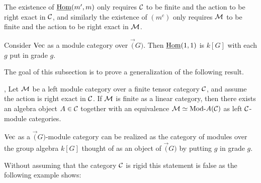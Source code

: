 \documentclass{amsart}
\begin{document}
\begin{remark}
	The existence of $\IHom(m', m)$ only requires $\cC$ to be finite and the action to be right exact in $\cC$, and similarly the existence of $(m^c)$ only requires $\cM$ to be finite and the action to be right exact in $\cM$.
\end{remark}

\begin{example}
Consider $\Vec$ as a module category over $\Vec(G)$.  Then $\IHom(1,1)$ is $k[G]$ with each $g$ put in grade $g$.
\end{example}



The goal of this subsection is to prove a generalization of the following result.

\begin{theorem}{\cite[Thm 2.11.6]{EGNO}, \cite[Thm 1]{MR1976459}} \label{thm:EGNO2.11.6}
	Let $\cM$ be a left module category over a finite tensor category $\cC$, and assume the action is right exact in $\cC$. If $\cM$ is finite as a linear category, then there exists an algebra object $A \in \cC$ together with an equivalence $\cM \simeq \Mod{}{A} (\cC)$ as left $\cC$-module categories. 
\end{theorem}

\begin{example}
$\Vec$ as a $\Vec(G)$-module category can be realized as the category of modules over the group algebra $k[G] $ thought of as an object of $\Vec(G)$ by putting $g$ in grade $g$.  
\end{example}

Without assuming that the category $\cC$ is rigid this statement is false as the following example shows: 
\end{document}
